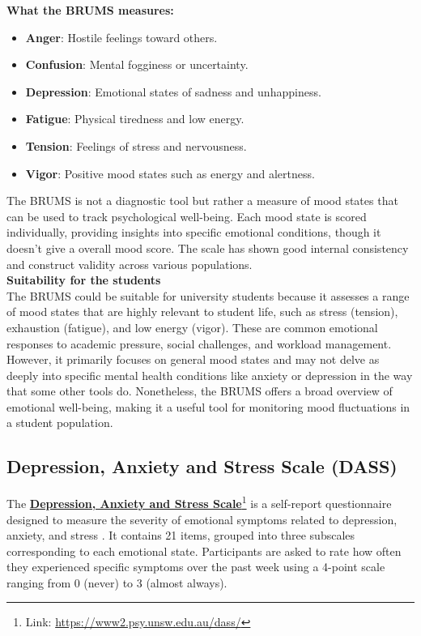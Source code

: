 \noindent \textbf{What the BRUMS measures:}
\begin{itemize}
    \item \textbf{Anger}: Hostile feelings toward others.
    \item \textbf{Confusion}: Mental fogginess or uncertainty.
    \item \textbf{Depression}: Emotional states of sadness and unhappiness.
    \item \textbf{Fatigue}: Physical tiredness and low energy.
    \item \textbf{Tension}: Feelings of stress and nervousness.
    \item \textbf{Vigor}: Positive mood states such as energy and alertness.
\end{itemize}
The BRUMS is not a diagnostic tool but rather a measure of mood states that can be used to track psychological well-being. Each mood state is scored individually, providing insights into specific emotional conditions, though it doesn't give a overall mood score. The scale has shown good internal consistency and construct validity across various populations.\vspace{5mm} \\
\textbf{Suitability for the students} \\
The BRUMS could be suitable for university students because it assesses a range of mood states that are highly relevant to student life, such as stress (tension), exhaustion (fatigue), and low energy (vigor). These are common emotional responses to academic pressure, social challenges, and workload management. However, it primarily focuses on general mood states and may not delve as deeply into specific mental health conditions like anxiety or depression in the way that some other tools do. Nonetheless, the BRUMS offers a broad overview of emotional well-being, making it a useful tool for monitoring mood fluctuations in a student population.

\subsection{Depression, Anxiety and Stress Scale (DASS)}

The \textbf{\href{https://www2.psy.unsw.edu.au/dass/}{Depression, Anxiety and Stress Scale}}\footnote{Link: \url{https://www2.psy.unsw.edu.au/dass/}} is a self-report questionnaire designed to measure the severity of emotional symptoms related to depression, anxiety, and stress \cite{dass-review}. It contains 21 items, grouped into three subscales corresponding to each emotional state. Participants are asked to rate how often they experienced specific symptoms over the past week using a 4-point scale ranging from 0 (never) to 3 (almost always).\vspace{5mm}

